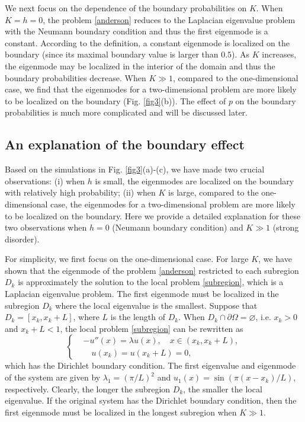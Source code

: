 \documentclass[a4paper,11pt]{article}
\begin{document}
We next focus on the dependence of the boundary probabilities on $K$. When $K = h = 0$, the problem \eqref{anderson} reduces to the Laplacian eigenvalue problem with the Neumann boundary condition and thus the first eigenmode is a constant. According to the definition, a constant eigenmode is localized on the boundary (since its maximal boundary value is larger than $0.5$). As $K$ increases, the eigenmode may be localized in the interior of the domain and thus the boundary probabilities decrease. When $K\gg 1$, compared to the one-dimensional case, we find that the eigenmodes for a two-dimensional problem are more likely to be localized on the boundary (Fig. \ref{fig3}(b)). The effect of $p$ on the boundary probabilities is much more complicated and will be discussed later.

\subsection{An explanation of the boundary effect}
Based on the simulations in Fig. \ref{fig3}(a)-(c), we have made two crucial observations: (i) when $h$ is small, the eigenmodes are localized on the boundary with relatively high probability; (ii) when $K$ is large, compared to the one-dimensional case, the eigenmodes for a two-dimensional problem are more likely to be localized on the boundary. Here we provide a detailed explanation for these two observations when $h = 0$ (Neumann boundary condition) and $K\gg 1$ (strong disorder).

For simplicity, we first focus on the one-dimensional case. For large $K$, we have shown that the eigenmode of the problem \eqref{anderson} restricted to each subregion $D_k$ is approximately the solution to the local problem \eqref{subregion}, which is a Laplacian eigenvalue problem. The first eigenmode must be localized in the subregion $D_k$ where the local eigenvalue is the smallest. Suppose that $D_k = [x_k, x_k+L]$, where $L$ is the length of $D_k$. When $D_k \cap \partial \Omega = \varnothing$, i.e. $x_k>0$ and $x_k+L<1$, the local problem \eqref{subregion} can be rewritten as
\begin{equation}\label{regionD}
\left\{
\begin{split}
& - u''(x) = \lambda u(x), \quad x \in (x_k, x_k+L), \\
& \quad u(x_k) = u(x_k+L) = 0,
\end{split}
\right.
\end{equation}
which has the Dirichlet boundary condition. The first eigenvalue and eigenmode of the system are given by $\lambda_1 = (\pi/L)^2$ and $u_1(x) = \sin(\pi(x-x_k)/L)$, respectively. Clearly, the longer the subregion $D_k$, the smaller the local eigenvalue. If the original system has the Dirichlet boundary condition, then the first eigenmode must be localized in the longest subregion when $K\gg 1$.
\end{document}
